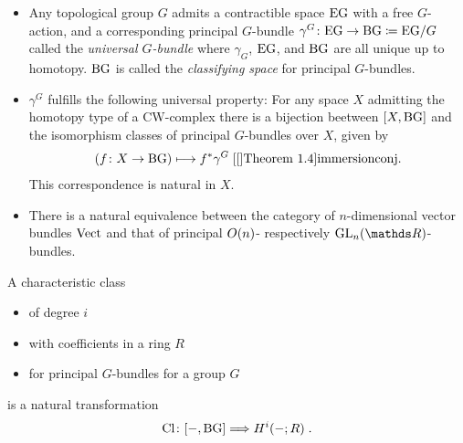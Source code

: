 \begin{Def} 
  \begin{itemize}
  \item Any topological group $G$ admits a contractible space $\mathrm{E}\mathrm{G}$ with a
    free $G$-action, and a corresponding principal $G$-bundle
    $\gamma^G\colon \mathrm{E}\mathrm{G}\to\mathrm{BG}\coloneqq \mathrm{E}\mathrm{G}/G$ called the
    \emph{universal $G$-bundle}
    where $\gamma_G$, $\mathrm{E}\mathrm{G}$, and $\mathrm{BG}$ are all unique up to
    homotopy. %
    $\mathrm{BG}$ is called the \emph{classifying space} for principal
    $G$-bundles.
  \item $\gamma^G$ fulfills the following universal property:
    For any space $X$ admitting the homotopy type of a CW-complex
    there is a bijection beetween $[X,\mathrm{BG}]$ and the isomorphism classes of
    principal $G$-bundles over $X$, given by
    \begin{gather*}
      \left(f\colon X\to\BG \right) \longmapsto \pb f \gamma^G
      \;
      \text{\optcite[Theorem 1.4]{immersionconj}}.
    \end{gather*}
    This correspondence is natural in $X$.
  \item There is a natural equivalence between the category of
    $n$-dimensional vector bundles $\mathrm{Vect}$ and that of principal
    $O(n)$- respectively $\GL n$-bundles.
  \end{itemize}
\end{Def}

\begin{Def}
  A characteristic class
  \begin{itemize}
  \item of degree $i$
  \item with coefficients in a ring $R$
  \item for principal $G$-bundles for a group $G$
  \end{itemize}
  is a natural transformation
  \begin{gather*}
    \mathrm{Cl}\colon [-, \mathrm{BG}] \Longrightarrow H^i(-; R)\;.
  \end{gather*}
\end{Def}

